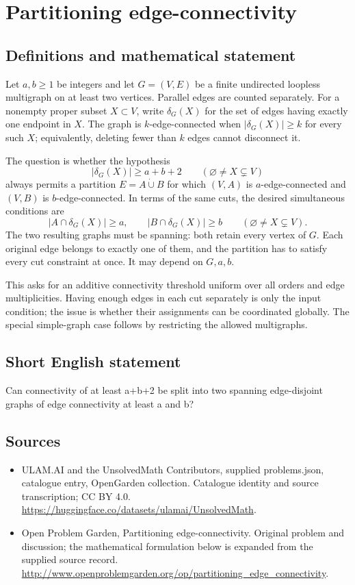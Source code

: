 \documentclass[11pt,a4paper]{article}
\begin{document}
\section*{Partitioning edge-connectivity}\label{statement}

\subsection{Definitions and mathematical statement}
Let $a,b\geq1$ be integers and let $G=(V,E)$ be a finite
undirected loopless multigraph on at least two vertices. Parallel
edges are counted separately. For a nonempty proper subset
$X\subset V$, write $\delta_G(X)$ for the set of edges having
exactly one endpoint in $X$. The graph is $k$-edge-connected
when $|\delta_G(X)|\geq k$ for every such $X$; equivalently,
deleting fewer than $k$ edges cannot disconnect it.

The question is whether the hypothesis
\[
 |\delta_G(X)|\geq a+b+2
 \qquad(\varnothing\neq X\subsetneq V)
\]
always permits a partition $E=A\mathbin{\dot\cup}B$ for which
$(V,A)$ is $a$-edge-connected and $(V,B)$ is $b$-edge-connected.
In terms of the same cuts, the desired simultaneous conditions are
\[
 |A\cap\delta_G(X)|\geq a,\qquad
 |B\cap\delta_G(X)|\geq b
 \qquad(\varnothing\neq X\subsetneq V).
\]
The two resulting graphs must be spanning: both retain every
vertex of $G$. Each original edge belongs to exactly one of
them, and the partition has to satisfy every cut constraint
at once. It may depend on $G,a,b$.

This asks for an additive connectivity threshold uniform over
all orders and edge multiplicities. Having enough edges in
each cut separately is only the input condition; the issue is
whether their assignments can be coordinated globally. The
special simple-graph case follows by restricting the allowed
multigraphs.
\subsection{Short English statement}
Can connectivity of at least a+b+2 be split into two spanning edge-disjoint graphs of edge connectivity at least a and b?
\subsection{Sources}
\begin{itemize}
\item[S1] ULAM.AI and the UnsolvedMath Contributors, supplied problems.json, catalogue entry, OpenGarden collection. Catalogue identity and source transcription; CC BY 4.0.
\url{https://huggingface.co/datasets/ulamai/UnsolvedMath}.
\item[S2] Open Problem Garden, Partitioning edge-connectivity. Original problem and discussion; the mathematical formulation below is expanded from the supplied source record.
\url{http://www.openproblemgarden.org/op/partitioning_edge_connectivity}.
\end{itemize}
\end{document}

